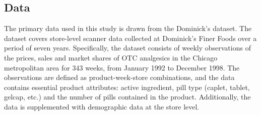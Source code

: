 \documentclass[12pt, authoryear]{elsarticle}
\begin{document}
\begin{table}[H]
	\caption{Market Shares by Firms, Products and Active Ingredients}
	\label{mshare}
\end{table}

\subsection{Data}

The primary data used in this study is drawn from the Dominick's dataset. The dataset covers store-level scanner data collected at Dominick's Finer Foods over a period of seven years. Specifically, the dataset consists of weekly observations of the prices, sales and market shares of OTC analgesics in the Chicago metropolitan area for 343 weeks, from January 1992 to December 1998. The observations are defined as product-week-store combinations, and the data contains essential product attributes: active ingredient, pill type (caplet, tablet, gelcap, etc.) and the number of pills contained in the product. Additionally, the data is supplemented with demographic data at the store level.
\end{document}
